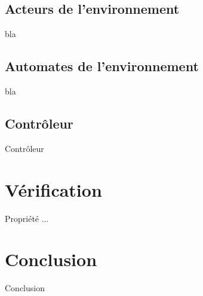 \documentclass{beamer} %
\begin{document}
\subsection{Acteurs de l'environnement}
\begin{frame}{bla}

\end{frame}

\subsection{Automates de l'environnement}
\begin{frame}{bla}

\end{frame}

\subsection{Contrôleur}
\begin{frame}{Contrôleur}

\end{frame}

\section{Vérification}
\begin{frame}{Propriété ...}

\end{frame}

\section{Conclusion}
\begin{frame}{Conclusion}

\end{frame}
\end{document}
